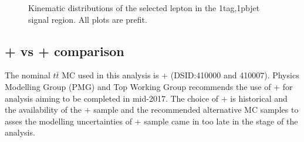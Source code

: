 \begin{figure}[!h]
\begin{center}
\caption{Kinematic distributions of the selected lepton in the 1tag,1pbjet signal region. All plots are prefit.}
\label{fig:boosted_SR_1tag_1pbjet_lepton}
\end{center}
\end{figure}



\clearpage
\FloatBarrier

\subsection{\POWHEG+ vs \POWHEG+ comparison}

The nominal $t\bar{t}$ MC used in this analysis is \POWHEG+ (DSID:410000 and 410007). Physics Modelling Group (PMG) 
and Top Working Group recommends the use of \POWHEG+ for analysis aiming to be completed in mid-2017. The choice of 
\POWHEG+ is historical and the availability of the \POWHEG+ sample and the recommended alternative MC samples
to asses the modelling uncertainties of \POWHEG+ sample came in too late in the stage of the analysis.

